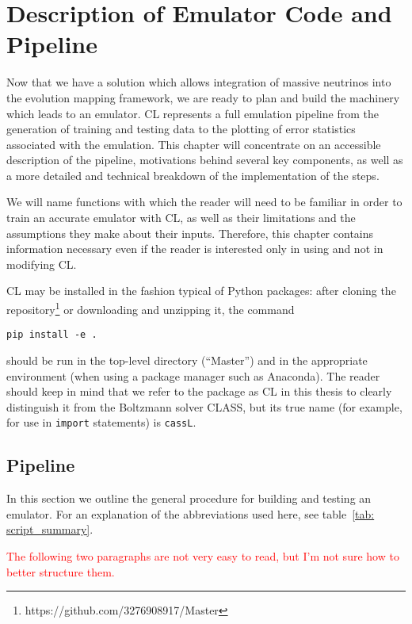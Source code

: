 \chapter{Description of Emulator Code and Pipeline}
\label{chap: cassL}

Now that we have a solution which allows integration of massive neutrinos
into the evolution mapping framework, we are ready to plan and build the
machinery which leads to an emulator. CL represents a full emulation pipeline from the generation of training and 
testing data to the plotting of error statistics associated with
the emulation. This chapter will concentrate on an accessible 
description of the pipeline, motivations behind several key components, as
well as a more detailed and technical breakdown of the implementation of
the steps.

We will name functions with which the
reader will need to be familiar in order to train an accurate emulator with
CL, as well as their limitations and the assumptions they make about their
inputs. Therefore, this chapter contains information necessary even if the
reader is interested only in using and not in modifying CL.

CL may be installed in the fashion typical of Python packages: after cloning
the repository\footnote{https://github.com/3276908917/Master}
or downloading and unzipping it, the command

\verb|pip install -e .|

should be run in the top-level directory (``Master'') and in the
appropriate environment (when using a package manager such as Anaconda).
The reader should keep in mind that we refer to the package as CL in this
thesis to clearly distinguish it from the Boltzmann solver CLASS, but its
true name (for example, for use in \texttt{import} statements) is
\texttt{cassL}.

\section{Pipeline}
\label{sec: flow_chart}


In this section we outline the general procedure for building and testing an
emulator. For an explanation of the abbreviations used here, see table~\ref{tab: script_summary}. 

\textcolor{red}{The following two paragraphs are not very easy to read, but 
I'm not sure how to better structure them.}

